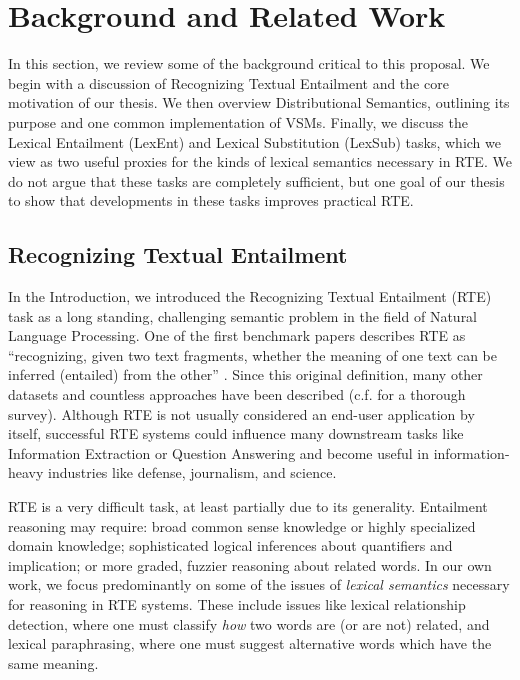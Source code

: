 \chapter{Background and Related Work}
\label{sec:background}

In this section, we review some of the background critical to this proposal.
We begin with a discussion of Recognizing Textual Entailment and the core
motivation of our thesis.  We then overview Distributional Semantics, outlining
its purpose and one common implementation of VSMs. Finally, we discuss the
Lexical Entailment (LexEnt) and Lexical Substitution (LexSub) tasks, which we
view as two useful proxies for the kinds of lexical semantics necessary in
RTE. We do not argue that these tasks are completely sufficient, but one goal
of our thesis to show that developments in these tasks improves practical RTE.

\section{Recognizing Textual Entailment}
\label{sec:textent}

In the Introduction, we introduced the Recognizing Textual Entailment (RTE)
task as a long standing, challenging semantic problem in the field of
Natural Language Processing.  One of the first benchmark papers describes RTE
as ``recognizing, given two text fragments, whether the meaning of one text can
be inferred (entailed) from the other'' \cite{dagan:2006:mlc}. Since this
original definition, many other datasets
\cite{giampiccolo:2007:pascal,bentivogli:2009:tac,marelli:2014:semeval} and
countless approaches have been described (c.f. 
for a thorough survey). Although RTE is not usually considered an
end-user application by itself, successful RTE systems could influence many
downstream tasks like Information Extraction or Question Answering and become
useful in information-heavy industries like defense, journalism, and science.

RTE is a very difficult task, at least partially due to its generality.
Entailment reasoning may require: broad common sense knowledge or highly
specialized domain knowledge; sophisticated logical inferences
about quantifiers and implication; or more graded, fuzzier reasoning about
related words. In our own work, we focus predominantly on some of the issues
of {\em lexical semantics} necessary for reasoning in RTE systems. These
include issues like lexical relationship detection, where one must classify
{\em how} two words are (or are not) related, and lexical paraphrasing, where
one must suggest alternative words which have the same meaning.

